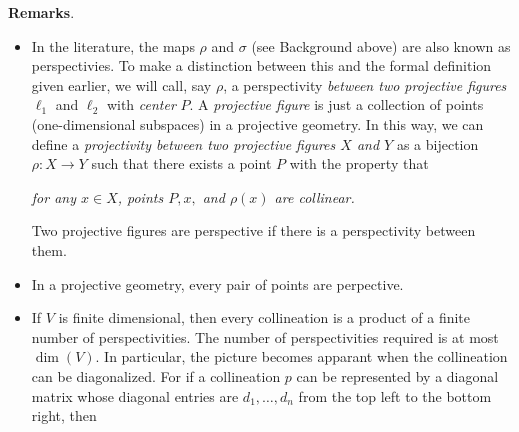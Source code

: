 \documentclass[12pt]{article}
\begin{document}
\textbf{Remarks}.
\begin{itemize}
\item In the literature, the maps $\rho$ and $\sigma$ (see Background above) are also known as perspectivies.  To make a distinction between this and the formal definition given earlier, we will call, say $\rho$, a perspectivity \emph{between two projective figures} $\ell_1$ and $\ell_2$ with \emph{center} $P$.  A \emph{projective figure} is just a collection of points (one-dimensional subspaces) in a projective geometry.  In this way, we can define a \emph{projectivity between two projective figures $X$ and $Y$} as a bijection $\rho:X\to Y$ such that there exists a point $P$ with the property that \begin{center} \emph{for any $x\in X$, points $P,x,$ and $\rho(x)$ are collinear.}\end{center}  Two projective figures are perspective if there is a perspectivity between them.
\item In a projective geometry, every pair of points are perpective.
\item If $V$ is finite dimensional, then every collineation is a product of a finite number of perspectivities.  The number of perspectivities required is at most $\operatorname{dim}(V)$.  In particular, the picture becomes apparant when the collineation can be diagonalized.  For if a collineation $p$ can be represented by a diagonal matrix whose diagonal entries are $d_1,\ldots, d_n$ from the top left to the bottom right, then 


\end{itemize}
\end{document}
